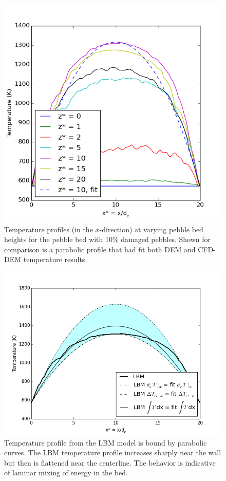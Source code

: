 \begin{figure}[t]
    \centering
    \includegraphics[width=\singleimagewidth]{chapters/figures/lbm/lbm-temp-profiles}
    \caption{Temperature profiles (in the $x$-direction) at varying pebble bed heights for the pebble bed with 10\% damaged pebbles. Shown for comparison is a parabolic profile that had fit both DEM and CFD-DEM temperature results.}\label{fig:lbm-temp-profiles}
\end{figure}

\begin{figure}[t]
    \centering
    \includegraphics[width=\singleimagewidth]{chapters/figures/lbm/lbm-temp-profile_parabolic}
    \caption{Temperature profile from the LBM model is bound by parabolic curves. The LBM temperature profile increases sharply near the wall but then is flattened near the centerline. The behavior is indicative of laminar mixing of energy in the bed.}\label{fig:lbm-temp-parabolas}
\end{figure}

